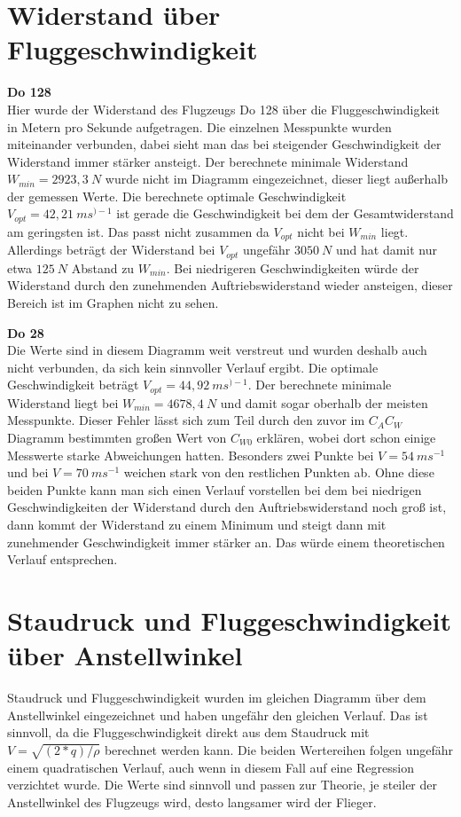 \section{Widerstand über Fluggeschwindigkeit}
\textbf {Do 128}\\
Hier wurde der Widerstand des Flugzeugs Do 128 über die Fluggeschwindigkeit in Metern pro Sekunde aufgetragen. Die einzelnen Messpunkte wurden miteinander verbunden, dabei sieht man das bei steigender Geschwindigkeit der Widerstand immer stärker ansteigt. Der berechnete minimale Widerstand $W_{min}=2923,3\ N$ wurde nicht im Diagramm eingezeichnet, dieser liegt außerhalb der gemessen Werte. Die berechnete optimale Geschwindigkeit $V_{opt}=42,21\  ms^{)-1}$ ist gerade die Geschwindigkeit bei dem der Gesamtwiderstand am geringsten ist. Das passt nicht zusammen da $V_{opt}$ nicht bei  $W_{min}$ liegt. Allerdings beträgt der Widerstand bei $V_{opt}$ ungefähr $3050\ N$ und hat damit nur etwa $125\ N$ Abstand zu $W_{min}$. Bei niedrigeren Geschwindigkeiten würde der Widerstand durch den zunehmenden Auftriebswiderstand wieder ansteigen, dieser Bereich ist im Graphen nicht zu sehen.

\textbf {Do 28}\\
Die Werte sind in diesem Diagramm weit verstreut und wurden deshalb auch nicht verbunden, da sich kein sinnvoller Verlauf ergibt. Die optimale Geschwindigkeit beträgt $V_{opt}=44,92\  ms^{)-1}$. Der berechnete minimale Widerstand liegt bei $W_{min}=4678,4\ N$ und damit sogar oberhalb der meisten Messpunkte. Dieser Fehler lässt sich zum Teil durch den zuvor im $C_A C_W$ Diagramm bestimmten großen Wert von $C_{W0}$ erklären, wobei dort schon einige Messwerte starke Abweichungen hatten. Besonders zwei Punkte bei $V=54\ ms^{-1}$ und bei $V=70\ ms^{-1}$ weichen stark von den restlichen Punkten ab. Ohne diese beiden Punkte kann man sich einen Verlauf vorstellen bei dem bei niedrigen Geschwindigkeiten der Widerstand durch den Auftriebswiderstand noch groß ist, dann kommt der Widerstand zu einem Minimum und steigt dann mit zunehmender Geschwindigkeit immer stärker an. Das würde einem theoretischen Verlauf entsprechen.

\section{Staudruck und Fluggeschwindigkeit über Anstellwinkel}
Staudruck und Fluggeschwindigkeit wurden im gleichen Diagramm über dem Anstellwinkel eingezeichnet und haben ungefähr den gleichen Verlauf. Das ist sinnvoll, da die Fluggeschwindigkeit direkt aus dem Staudruck mit $V=\sqrt{(2*q)/\rho}$ berechnet werden kann. Die beiden Wertereihen folgen ungefähr einem quadratischen Verlauf, auch wenn in diesem Fall auf eine Regression verzichtet wurde. Die Werte sind sinnvoll und passen zur Theorie, je steiler der Anstellwinkel des Flugzeugs wird, desto langsamer wird der Flieger.

